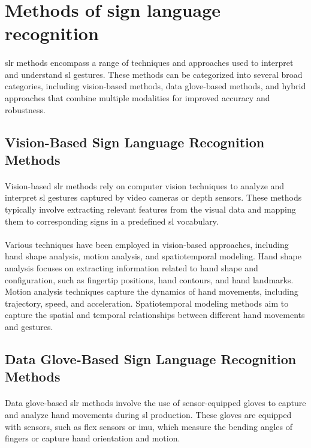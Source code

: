 \section{Methods of sign language recognition}
\paragraph{}
\ac{slr} methods encompass a range of techniques and approaches used to interpret and understand \ac{sl} gestures. These methods can be categorized into several broad categories, including vision-based methods, data glove-based methods, and hybrid approaches that combine multiple modalities for improved accuracy and robustness.
\subsection{Vision-Based Sign Language Recognition Methods}
\paragraph{}
Vision-based \ac{slr} methods rely on computer vision techniques to analyze and interpret \ac{sl} gestures captured by video cameras or depth sensors. These methods typically involve extracting relevant features from the visual data and mapping them to corresponding signs in a predefined \ac{sl} vocabulary.
\paragraph{}
Various techniques have been employed in vision-based approaches, including hand shape analysis, motion analysis, and spatiotemporal modeling. Hand shape analysis focuses on extracting information related to hand shape and configuration, such as fingertip positions, hand contours, and hand landmarks. Motion analysis techniques capture the dynamics of hand movements, including trajectory, speed, and acceleration. Spatiotemporal modeling methods aim to capture the spatial and temporal relationships between different hand movements and gestures.
\subsection{Data Glove-Based Sign Language Recognition Methods}
\paragraph{}
Data glove-based \ac{slr} methods involve the use of sensor-equipped gloves to capture and analyze hand movements during \ac{sl} production. These gloves are equipped with sensors, such as flex sensors or \ac{imu}, which measure the bending angles of fingers or capture hand orientation and motion.

